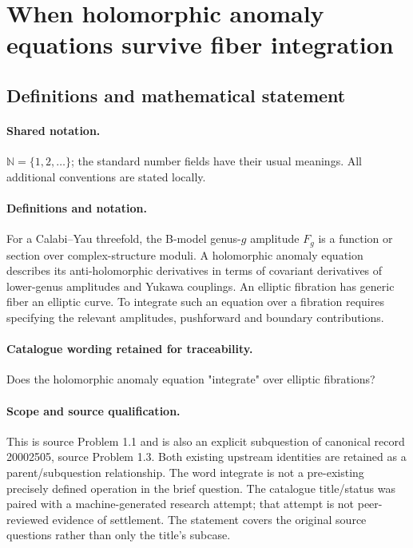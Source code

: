 \documentclass[11pt]{article}
\begin{document}
\section{When holomorphic anomaly equations survive fiber integration}\label{statement}

\subsection{Definitions and mathematical statement}

\paragraph{Shared notation.}$\mathbb N=\{1,2,\ldots\}$; the standard number fields have their usual meanings. All additional conventions are stated locally.


\paragraph{Definitions and notation.}For a Calabi--Yau threefold, the B-model genus-$g$ amplitude $F_g$ is a function or section over complex-structure moduli. A holomorphic anomaly equation describes its anti-holomorphic derivatives in terms of covariant derivatives of lower-genus amplitudes and Yukawa couplings. An elliptic fibration has generic fiber an elliptic curve. To integrate such an equation over a fibration requires specifying the relevant amplitudes, pushforward and boundary contributions.

\paragraph{Catalogue wording retained for traceability.}
Does the holomorphic anomaly equation "integrate" over elliptic fibrations?
\paragraph{Scope and source qualification.}This is source Problem 1.1 and is also an explicit subquestion of canonical record 20002505, source Problem 1.3. Both existing upstream identities are retained as a parent/subquestion relationship. The word integrate is not a pre-existing precisely defined operation in the brief question. The catalogue title/status was paired with a machine-generated research attempt; that attempt is not peer-reviewed evidence of settlement. The statement covers the original source questions rather than only the title’s subcase.
\end{document}
